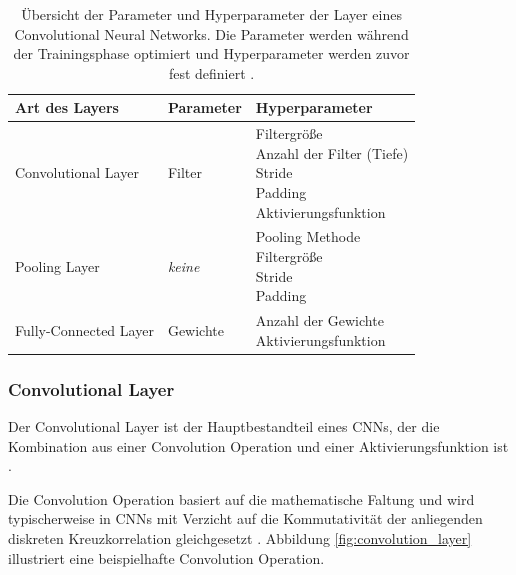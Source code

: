 \begin{table}[bh]
	\centering
	\caption{Übersicht der Parameter und Hyperparameter der Layer eines Convolutional Neural Networks. Die Parameter werden während der Trainingsphase optimiert und Hyperparameter werden zuvor fest definiert \cite{yamashitaConvolutionalNeuralNetworks2018}. }
	\begin{tabularx}{1.0\textwidth}{X X X}
		\textbf{Art des Layers} & \textbf{Parameter} & \textbf{Hyperparameter}\\
		\hline
		Convolutional Layer & Filter & \makecell[tl]{
			Filtergröße\\
			Anzahl der Filter (Tiefe)\\
			Stride\\
			Padding\\
			Aktivierungsfunktion
		}\\
		\hline
		Pooling Layer & \textit{keine} & \makecell[tl]{
			Pooling Methode\\
			Filtergröße\\
			Stride\\
			Padding
		}\\
		\hline
		Fully-Connected Layer & Gewichte & \makecell[tl]{
			Anzahl der Gewichte\\
			Aktivierungsfunktion
		}\\
		\hline
	\end{tabularx}
	\label{tab:layer_param}
\end{table}

\subsubsection{Convolutional Layer}
Der Convolutional Layer ist der Hauptbestandteil eines CNNs, der die Kombination aus einer Convolution Operation und einer Aktivierungsfunktion ist \cite{yamashitaConvolutionalNeuralNetworks2018}.

Die Convolution Operation basiert auf die mathematische Faltung und wird typischerweise in CNNs mit Verzicht auf die Kommutativität der anliegenden diskreten Kreuzkorrelation gleichgesetzt \cite{goodfellowDeepLearning2016}. Abbildung \ref{fig:convolution_layer} illustriert eine beispielhafte Convolution Operation.

